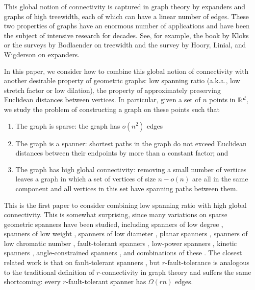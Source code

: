 \documentclass{sig-alternate}
\begin{document}
This global notion of connectivity is captured in graph theory by
expanders and graphs of high treewidth, each of which can have a linear
number of edges.  These two properties of graphs have an enormous number
of applications and have been the subject of intensive research for
decades.  See, for example, the book by Kloks \cite{k94} or the surveys
by Bodlaender \cite{b98,b07} on treewidth and the survey by Hoory, Linial,
and Wigderson \cite{hlw06} on expanders.

In this paper, we consider how to combine this global notion of
connectivity with another desirable property of geometric graphs:
low spanning ratio (a.k.a., low stretch factor or low dilation),  the
property of approximately preserving Euclidean distances between vertices.
In particular, given a set of $n$ points in $\mathbb{R}^d$, we study the problem
of constructing a graph on these points such that
\begin{enumerate}
  \item The graph is sparse: the graph has $o(n^2)$ edges
  \item The graph is a spanner: shortest paths in the graph do not exceed
  Euclidean distances between their endpoints by more than a constant
  factor; and
  \item The graph has high global connectivity: removing a small number
  of vertices leaves a graph in which a set of vertices of size $n-o(n)$
  are all in the same component and all vertices in this set have
  spanning paths between them.
\end{enumerate}

This is the first paper to consider combining low spanning ratio
with high global connectivity.  This is somewhat surprising, since
many variations on sparse geometric spanners have been studied,
including spanners of low degree \cite{abcghsv08,cc10,s06}, spanners
of low weight \cite{bcfms10,dn97,gln02}, spanners of low diameter
\cite{ams94,ams99}, planar spanners \cite{accdsz96,c89,dj89,kg89},
spanners of low chromatic number \cite{bccmsz09}, fault-tolerant
spanners \cite{abfg09,cz04,lns02,l99}, low-power spanners
\cite{aack11,ss10,wl06}, kinetic spanners \cite{ab11,abg10},
angle-constrained spanners \cite{cs10}, and combinations of these
\cite{admss95,as97,bfrv12,bgs05,bsx09,cc10b}.  The closest related
work is that on fault-tolerant spanners \cite{abfg09,cz04,lns02,l99},
but $r$-fault-tolerance is analogous to the traditional definition
of $r$-connectivity in graph theory and suffers the same shortcoming:
every $r$-fault-tolerant spanner has $\Omega(rn)$ edges.
\end{document}
